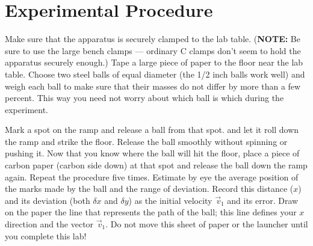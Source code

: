\section*{Experimental Procedure}
     Make sure that the apparatus is securely clamped to the lab table.
({\bf NOTE:}  Be sure to use the large bench clamps --- ordinary C clamps don't
seem to hold the apparatus securely enough.)  Tape a large piece of
paper to the floor near the lab table.  Choose two
steel balls of equal diameter (the 1/2 inch balls work well) and weigh
each ball to make sure that their masses do not differ by more than a
few percent.  This way you need not worry about which ball is which
during the experiment.

    
Mark a spot on the ramp and  release a ball from that spot.
and let it roll down the
ramp and strike the floor.  Release the ball smoothly without spinning or
pushing it. 
Now that you know where the ball will hit the floor, place a piece of
carbon paper (carbon side down) at that spot and release the
ball down the ramp again.    Repeat the procedure five times.
Estimate by eye the average
position of the marks made by the ball and the range of deviation.  
Record this distance ($x$) and its deviation (both $\delta x$ and $\delta y$) as
the initial velocity $\vec{\,v}_1$ and its error.
Draw on the paper the line that represents the path of the ball;
this line defines your $x$ direction and the vector $\vec{\,v}_1$.
Do not move this sheet of paper or the launcher until you complete this lab!

